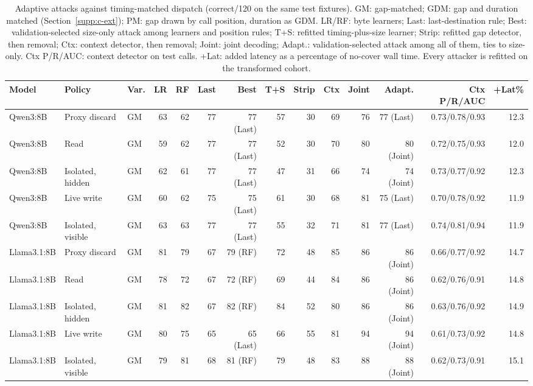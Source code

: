 \begin{table}[t]\centering\scriptsize
\caption{Adaptive attacks against timing-matched dispatch (correct/120 on the same test fixtures). GM: gap-matched; GDM: gap and duration matched (Section~\ref{supp:c-ext}); PM: gap drawn by call position, duration as GDM. LR/RF: byte learners; Last: last-destination rule; Best: validation-selected size-only attack among learners and position rules; T+S: refitted timing-plus-size learner; Strip: refitted gap detector, then removal; Ctx: context detector, then removal; Joint: joint decoding; Adapt.: validation-selected attack among all of them, ties to size-only. Ctx P/R/AUC: context detector on test calls. +Lat: added latency as a percentage of no-cover wall time. Every attacker is refitted on the transformed cohort.}\label{tab:d-cells}
\setlength{\tabcolsep}{2.6pt}
\begin{tabularx}{\textwidth}{@{}lYlrrrrrrrrrrr@{}}\toprule
Model & Policy & Var. & LR & RF & Last & Best & T+S & Strip & Ctx & Joint & Adapt. & Ctx P/R/AUC & +Lat\%\\\midrule
Qwen3:8B & Proxy discard & GM & 63 & 62 & 77 & 77 (Last) & 57 & 30 & 69 & 76 & 77 (Last) & 0.73/0.78/0.93 & 12.3 \\
Qwen3:8B & Read & GM & 59 & 62 & 77 & 77 (Last) & 52 & 30 & 70 & 80 & 80 (Joint) & 0.72/0.75/0.93 & 12.0 \\
Qwen3:8B & Isolated, hidden & GM & 62 & 61 & 77 & 77 (Last) & 47 & 31 & 66 & 74 & 74 (Joint) & 0.73/0.77/0.92 & 12.3 \\
Qwen3:8B & Live write & GM & 60 & 62 & 75 & 75 (Last) & 61 & 30 & 68 & 81 & 75 (Last) & 0.70/0.78/0.92 & 11.9 \\
Qwen3:8B & Isolated, visible & GM & 63 & 63 & 77 & 77 (Last) & 55 & 32 & 71 & 81 & 77 (Last) & 0.74/0.81/0.94 & 11.9 \\
Llama3.1:8B & Proxy discard & GM & 81 & 79 & 67 & 79 (RF) & 72 & 48 & 85 & 86 & 86 (Joint) & 0.66/0.77/0.92 & 14.7 \\
Llama3.1:8B & Read & GM & 78 & 72 & 67 & 72 (RF) & 69 & 44 & 84 & 86 & 86 (Joint) & 0.62/0.76/0.91 & 14.8 \\
Llama3.1:8B & Isolated, hidden & GM & 81 & 82 & 67 & 82 (RF) & 84 & 52 & 80 & 86 & 86 (Joint) & 0.63/0.76/0.92 & 14.9 \\
Llama3.1:8B & Live write & GM & 80 & 75 & 65 & 65 (Last) & 66 & 55 & 81 & 94 & 94 (Joint) & 0.61/0.73/0.92 & 14.8 \\
Llama3.1:8B & Isolated, visible & GM & 79 & 81 & 68 & 81 (RF) & 79 & 48 & 83 & 88 & 88 (Joint) & 0.62/0.73/0.91 & 15.1 \\

\end{tabularx}
\end{table}
